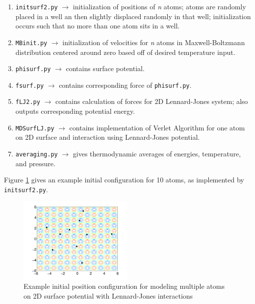\documentclass[12pt, oneside]{article}
\begin{document}
\vspace{5mm}
 \begin{enumerate}
   \item \verb!initsurf2.py!   $\rightarrow$ initialization of positions of \textit{n} atoms; atoms are randomly placed in a well an then slightly displaced randomly in that well; initialization occurs such that no more than one atom sits in a well.
   \item \verb!MBinit.py!   $\rightarrow$ initialization of velocities for \textit{n} atoms in Maxwell-Boltzmann distribution centered around zero based off of desired temperature input.
   \item \verb!phisurf.py!  $\rightarrow$ contains surface potential.
    \item \verb!fsurf.py!     $\rightarrow$ contains corresponding force of \verb!phisurf.py!.
     \item \verb!fLJ2.py!     $\rightarrow$ contains calculation of forces for 2D Lennard-Jones system; also outputs corresponding potential energy.
    \item \verb!MDSurfLJ.py!  $\rightarrow$ contains implementation of Verlet Algorithm for one atom on 2D surface and interaction using Lennard-Jones potential.
    \item \verb!averaging.py!  $\rightarrow$ gives thermodynamic averages of energies, temperature, and pressure.
\end{enumerate}
 \vspace{5mm}
 
Figure \ref{fig:init} gives an example initial configuration for 10 atoms, as implemented by \verb!initsurf2.py!.

\begin{figure}[htbp]
   \centering
   \includegraphics[width=0.5\textwidth]{./figs/ex2-init.png} %
   \caption{Example initial position configuration for modeling multiple atoms on 2D surface potential with Lennard-Jones interactions}
   \label{fig:init}
\end{figure}
\end{document}
